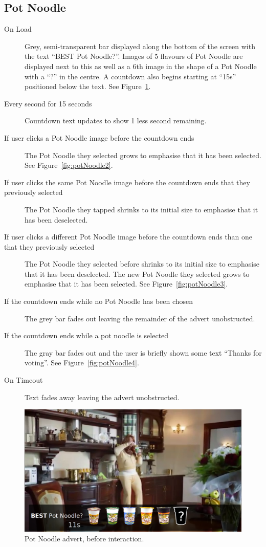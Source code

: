 \clearpage
\subsection{Pot Noodle}
	\begin{description}
		\item[On Load]{Grey, semi-transparent bar displayed along the bottom of the screen with the text ``BEST Pot Noodle?''. Images of 5 flavours of Pot Noodle are displayed next to this as well as a 6th image in the shape of a Pot Noodle with a ``?'' in the centre. A countdown also begins starting at ``15s'' positioned below the text. See Figure~\ref{fig:potNoodle1}.}
		\item[Every second for 15 seconds]{Countdown text updates to show 1 less second remaining.}
		\item[If user clicks a Pot Noodle image before the countdown ends]{The Pot Noodle they selected grows to emphasise that it has been selected. See Figure~\ref{fig:potNoodle2}.}
		\item[If user clicks the same Pot Noodle image before the countdown ends that they previously selected]{The Pot Noodle they tapped shrinks to its initial size to emphasise that it has been deselected.}
		\item[If user clicks a different Pot Noodle image before the countdown ends than one that they previously selected]{The Pot Noodle they selected before shrinks to its initial size to emphasise that it has been deselected. The new Pot Noodle they selected grows to emphasise that it has been selected. See Figure~\ref{fig:potNoodle3}.}
		\item[If the countdown ends while no Pot Noodle has been chosen]{The grey bar fades out leaving the remainder of the advert unobstructed.}
		\item[If the countdown ends while a pot noodle is selected]{The gray bar fades out and the user is briefly shown some text ``Thanks for voting''. See Figure~\ref{fig:potNoodle4}.}
		\item[On Timeout]{Text fades away leaving the advert unobstructed.}
	\end{description}

	\begin{figure}[th]
		\centering
		\includegraphics[width=\textwidth,height=0.5\textheight,keepaspectratio]{images/adverts/pot_noodle-1.png}
		\caption{Pot Noodle advert, before interaction.}
		\label{fig:potNoodle1}
	\end{figure}

